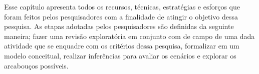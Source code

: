 Esse capítulo apresenta todos os recursos, técnicas, estratégias e esforços que foram feitos pelos pesquisadores com a finalidade de atingir o objetivo dessa pesquisa. As etapas adotadas pelos pesquisadores são definidas da seguinte maneira; fazer uma revisão exploratória em conjunto com de campo de uma dada atividade que se enquadre com os critérios dessa pesquisa, formalizar em um modelo conceitual, realizar inferências para avaliar os cenários e explorar os arcabouços possíveis.
